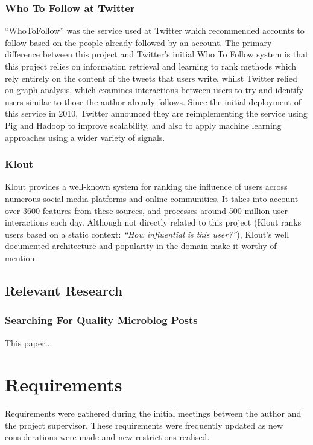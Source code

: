 \documentclass{l4proj}
\begin{document}
\subsection{Who To Follow at Twitter}
``WhoToFollow'' was the service used at Twitter which recommended accounts to follow based on the people already followed by an account. The primary difference between this project and Twitter's initial Who To Follow system is that this project relies on information retrieval and learning to rank methods which rely entirely on the content of the tweets that users write, whilst Twitter relied on graph analysis, which examines interactions between users to try and identify users similar to those the author already follows. Since the initial deployment of this service in 2010, Twitter announced they are reimplementing the service using Pig and Hadoop to improve scalability, and also to apply machine learning approaches using a wider variety of signals.

\subsection{Klout}
Klout provides a well-known system for ranking the influence of users across numerous social media platforms and online communities. It takes into account over 3600 features from these sources, and processes around 500 million user interactions each day. Although not directly related to this project (Klout ranks users based on a static context: \textit{``How influential is this user?''}), Klout's well documented architecture and popularity in the domain make it worthy of mention.

\section{Relevant Research}

    \subsection{Searching For Quality Microblog Posts}
    This paper...

\chapter{Requirements}

Requirements were gathered during the initial meetings between the author and the project supervisor. These requirements were frequently updated as new considerations were made and new restrictions realised.
\end{document}
